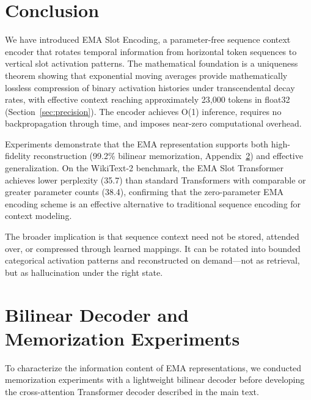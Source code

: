 \documentclass[11pt]{article}
\begin{document}
\section{Conclusion}

We have introduced EMA Slot Encoding, a parameter-free sequence context encoder that rotates temporal information from horizontal token sequences to vertical slot activation patterns. The mathematical foundation is a uniqueness theorem showing that exponential moving averages provide mathematically lossless compression of binary activation histories under transcendental decay rates, with effective context reaching approximately 23{,}000 tokens in float32 (Section~\ref{sec:precision}). The encoder achieves O(1) inference, requires no backpropagation through time, and imposes near-zero computational overhead.

Experiments demonstrate that the EMA representation supports both high-fidelity reconstruction (99.2\% bilinear memorization, Appendix~\ref{app:bilinear}) and effective generalization. On the WikiText-2 benchmark, the EMA Slot Transformer achieves lower perplexity (35.7) than standard Transformers with comparable or greater parameter counts (38.4), confirming that the zero-parameter EMA encoding scheme is an effective alternative to traditional sequence encoding for context modeling.

The broader implication is that sequence context need not be stored, attended over, or compressed through learned mappings. It can be rotated into bounded categorical activation patterns and reconstructed on demand---not as retrieval, but as hallucination under the right state.



\appendix
\section{Bilinear Decoder and Memorization Experiments}
\label{app:bilinear}

To characterize the information content of EMA representations, we conducted memorization experiments with a lightweight bilinear decoder before developing the cross-attention Transformer decoder described in the main text.
\end{document}
